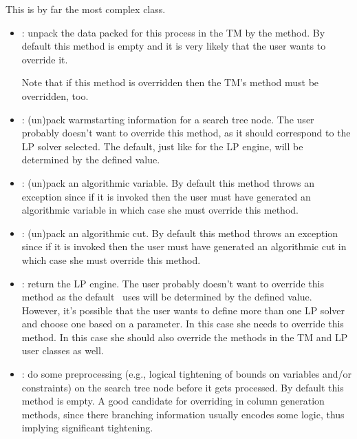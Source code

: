 This is by far the most complex class. 
\begin{itemize}
\item {}: unpack the data packed for this process in
  the TM by the  method. By default
  this method is empty and it is very likely that the user wants to override
  it.

  Note that if this method is overridden then the TM's
   method must be overridden, too.

\item {}: (un)pack warmstarting information for a
  search tree node. The user probably doesn't want to override this method, as
  it should correspond to the LP solver selected. The default, just like for
  the LP engine, will be determined by the defined  value.

\item {}: (un)pack an algorithmic variable. By
  default this method throws an exception since if it is invoked then the user
  must have generated an algorithmic variable in which case she must override
  this method.

\item {}: (un)pack an algorithmic cut. By
  default this method throws an exception since if it is invoked then the user
  must have generated an algorithmic cut in which case she must override
  this method.
  
\item {}: return the LP engine. The user
  probably doesn't want to override this method as the default \BB\ uses will
  be determined by the defined  value. However, it's
  possible that the user wants to define more than one LP solver and choose
  one based on a parameter.  In this case she needs to override this method.
  In this case she should also override the 
  methods 
  in the TM and LP user classes as well.

\item {}: do some preprocessing
  (e.g., 
  logical tightening of bounds on variables and/or constraints) on the
  search tree node before it gets processed. By default this method is empty.
  A good candidate for overriding in column generation methods, since there
  branching information usually encodes some logic, thus implying significant
  tightening.


\end{itemize}
